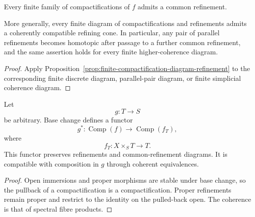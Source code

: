 \begin{corollary}
\label{cor:compactification-common-refinement}
Every finite family of compactifications of \(f\) admits a common refinement.

More generally, every finite diagram of compactifications and refinements
admits a coherently compatible refining cone.  In particular, any pair of
parallel refinements becomes homotopic after passage to a further common
refinement, and the same assertion holds for every finite higher-coherence
diagram.
\end{corollary}

\begin{proof}
Apply
Proposition~\ref{prop:finite-compactification-diagram-refinement} to the
corresponding finite discrete diagram, parallel-pair diagram, or finite
simplicial coherence diagram.
\end{proof}

\begin{proposition}
\label{prop:compactification-base-change}
Let
\[
    g:T\longrightarrow S
\]
be arbitrary.  Base change defines a functor
\[
    g^*:
    \operatorname{Comp}(f)
    \longrightarrow
    \operatorname{Comp}(f_T),
\]
where
\[
    f_T:X\times_ST\longrightarrow T.
\]
This functor preserves refinements and common-refinement diagrams.  It is
compatible with composition in \(g\) through coherent equivalences.
\end{proposition}

\begin{proof}
Open immersions and proper morphisms are stable under base change, so the
pullback of a compactification is a compactification.  Proper refinements
remain proper and restrict to the identity on the pulled-back open.  The
coherence is that of spectral fibre products.
\end{proof}

